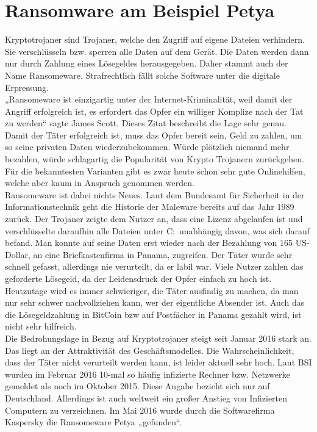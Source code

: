 \section{Ransomware am Beispiel Petya}
Kryptotrojaner sind Trojaner, welche den Zugriff auf eigene Dateien verhindern. Sie verschlüsseln bzw. sperren alle Daten auf dem Gerät. Die Daten werden dann nur durch Zahlung eines Lösegeldes herausgegeben. Daher stammt auch der Name Ransomeware. Strafrechtlich fällt solche Software unter die digitale Erpressung.\\

„Ransomeware ist einzigartig unter der Internet-Kriminalität, weil damit der Angriff erfolgreich ist, es erfordert das Opfer ein williger Komplize nach der Tat zu werden“ sagte James Scott. Dieses Zitat beschreibt die Lage sehr genau. Damit der Täter erfolgreich ist, muss das Opfer bereit sein, Geld zu zahlen, um so seine privaten Daten wiederzubekommen. Würde plötzlich niemand mehr bezahlen, würde schlagartig die Popularität von Krypto Trojanern zurückgehen. Für die bekanntesten Varianten gibt es zwar heute schon sehr gute Onlinehilfen, welche aber kaum in Anspruch genommen werden. \\

Ransomeware ist dabei nichts Neues. Laut dem Bundesamt für Sicherheit in der Informationstechnik geht die Historie der Maleware bereits auf das Jahr 1989 zurück. Der Trojaner zeigte dem Nutzer an, dass eine Lizenz abgelaufen ist und verschlüsselte daraufhin alle Dateien unter C:\ unabhängig davon, was sich darauf befand. Man konnte auf seine Daten erst wieder nach der Bezahlung von 165 US-Dollar, an eine Briefkastenfirma in Panama, zugreifen. Der Täter wurde sehr schnell gefasst, allerdings nie verurteilt, da er labil war. Viele Nutzer zahlen das geforderte Lösegeld, da der Leidensdruck der Opfer einfach zu hoch ist. Heutzutage wird es immer schwieriger, die Täter ausfindig zu machen, da man nur sehr schwer nachvollziehen kann, wer der eigentliche Absender ist. Auch das die Lösegeldzahlung in BitCoin bzw auf Postfächer in Panama gezahlt wird, ist nicht sehr hilfreich.\\

Die Bedrohungslage in Bezug auf Kryptotrojaner steigt seit Januar 2016 stark an. Das liegt an der Attraktivität des Geschäftsmodelles. Die Wahrscheinlichkeit, dass der Täter nicht verurteilt werden kann, ist leider aktuell sehr hoch. Laut BSI wurden im Februar 2016 10-mal so häufig infizierte Rechner bzw. Netzwerke gemeldet als noch im Oktober 2015. Diese Angabe bezieht sich nur auf Deutschland. Allerdings ist auch weltweit ein großer Anstieg von Infizierten Computern zu verzeichnen. Im Mai 2016 wurde durch die Softwarefirma Kaspersky die Ransomeware Petya „gefunden“.\\


